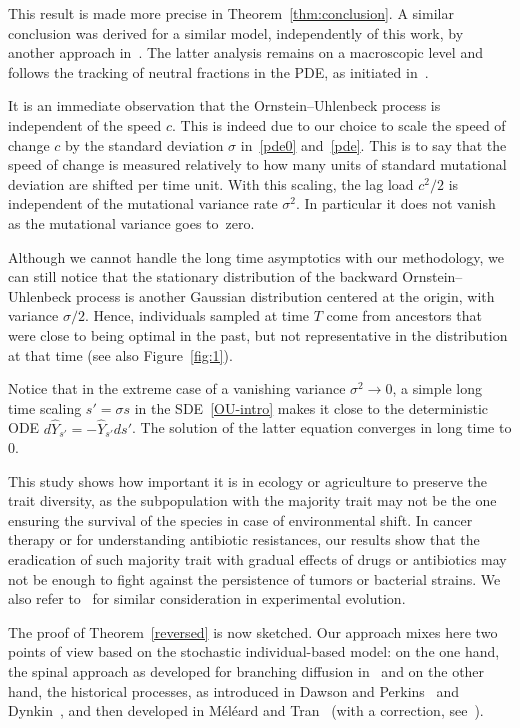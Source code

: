 \documentclass[10pt]{amsart}
\theoremstyle{definition}\newtheorem{defi}[theo]{Definition}\newtheorem{rema}[theo]{Remark}\newtheorem{exam}[theo]{Example}\newtheorem{exem}[theo]{Example}\newtheorem{nota}[theo]{Notation}
\begin{document}
This result is made more precise in Theorem~\ref{thm:conclusion}. A similar conclusion was derived for a similar model, independently of this work, by another approach in~\cite{ForienGarnierPatout}. The latter analysis remains on a macroscopic level and follows the tracking of neutral fractions in the PDE, as initiated in~\cite{Roquesetal}. 

It is an immediate observation that the Ornstein--Uhlenbeck process is independent of the speed $c$. This is indeed due to our choice to scale the speed of change $c$ by the standard deviation $\sigma$ in~\eqref{pde0} and~\eqref{pde}. This is to say that the speed of change is measured relatively to how many units of standard mutational deviation are shifted per time unit. With this scaling, the lag load $c^2/2$ is independent of the mutational variance rate $\sigma^2$. In particular it does not vanish as the mutational variance goes to~zero. 


Although we cannot handle the long time asymptotics with our methodology, we can still notice that the stationary distribution of the backward Ornstein--Uhlenbeck process is another Gaussian distribution centered at the origin, with variance $\sigma/2$. Hence, individuals sampled at time $T$ come from ancestors that were close to being optimal in the past, but not representative in the distribution at that time (see also Figure~\ref{fig:1}).



Notice that in the extreme case of a vanishing variance $\sigma^2\to 0$, a simple long time scaling $s' = \sigma s$ in the SDE~\eqref{OU-intro} makes it close to the deterministic ODE $d\widehat{Y}_{s'}=- \widehat{Y}_{s'}ds'$. The solution of the latter equation converges in long time to 0.


This study shows how important it is in ecology or agriculture to preserve the trait diversity, as the subpopulation with the majority trait may not be the one ensuring the survival of the species in case of environmental shift. In cancer therapy or for understanding antibiotic resistances, our results show that the eradication of such majority trait with gradual effects of drugs or antibiotics may not be enough to fight against the persistence of tumors or bacterial strains. We also refer to~\cite{guzella_slower_2018} for similar consideration in experimental evolution.



The proof of Theorem~\ref{reversed} is now sketched. Our approach mixes here two points of view based on the stochastic individual-based model: on the one hand, the spinal approach as developed for branching diffusion in~\cite{bansaye_limit_2011,hardyharris3,harrisroberts2011,Marguet1,Marguet2} and on the other hand, the historical processes, as introduced in Dawson and Perkins~\cite{dawsonperkinsAMS,perkinsAMS,perkins} and Dynkin~\cite{dynkin91}, and then developed in Méléard and Tran~\cite{meleardtran_suphist} (with a correction, see~\cite{kliem,chihdr}).
\end{document}
